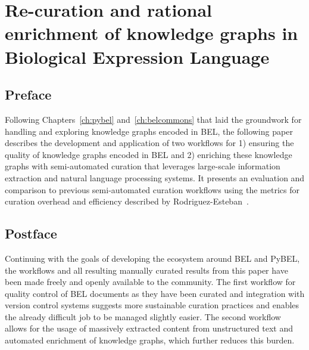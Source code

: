 \chapter{Re-curation and rational enrichment of knowledge graphs in Biological Expression Language}
\label{ch:recuration}

\section*{Preface}

Following Chapters~\ref{ch:pybel} and~\ref{ch:belcommons} that laid the groundwork for handling and exploring knowledge graphs encoded in \ac{BEL}, the following paper describes the development and application of two workflows for 1) ensuring the quality of knowledge graphs encoded in \ac{BEL} and 2) enriching these knowledge graphs with semi-automated curation that leverages large-scale information extraction and natural language processing systems.
It presents an evaluation and comparison to previous semi-automated curation workflows using the metrics for curation overhead and efficiency described by Rodriguez-Esteban~\cite{Rodriguez-Esteban2015}.

\vspace*{\fill}



\section*{Postface}

Continuing with the goals of developing the ecosystem around \ac{BEL} and PyBEL, the workflows and all resulting manually curated results from this paper have been made freely and openly available to the community.
The first workflow for quality control of \ac{BEL} documents as they have been curated and integration with version control systems suggests more sustainable curation practices and enables the already difficult job to be managed slightly easier.
The second workflow allows for the usage of massively extracted content from unstructured text and automated enrichment of knowledge graphs, which further reduces this burden.
